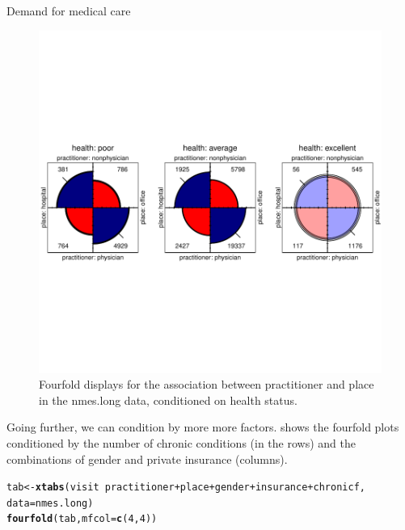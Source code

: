 \documentclass[11pt]{book}\usepackage[]{graphicx}\usepackage[]{color}
\makeatletter
\newcommand{\hlnum}[1]{\textcolor[rgb]{0.686,0.059,0.569}{#1}}%
\newcommand{\hlopt}[1]{\textcolor[rgb]{0,0,0}{#1}}%
\newcommand{\hlstd}[1]{\textcolor[rgb]{0.345,0.345,0.345}{#1}}%
\newcommand{\hlkwb}[1]{\textcolor[rgb]{0.69,0.353,0.396}{#1}}%
\newcommand{\hlkwc}[1]{\textcolor[rgb]{0.333,0.667,0.333}{#1}}%
\newcommand{\hlkwd}[1]{\textcolor[rgb]{0.737,0.353,0.396}{\textbf{#1}}}%
\newenvironment{kframe}{%
 \def\at@end@of@kframe{}%
 \ifinner\ifhmode%
  \def\at@end@of@kframe{\end{minipage}}%
  \begin{minipage}{\columnwidth}%
 \fi\fi%
 \def\FrameCommand##1{\hskip\@totalleftmargin \hskip-\fboxsep
 \colorbox{shadecolor}{##1}\hskip-\fboxsep
     \hskip-\linewidth \hskip-\@totalleftmargin \hskip\columnwidth}%
 \MakeFramed {\advance\hsize-\width
   \@totalleftmargin\z@ \linewidth\hsize
   \@setminipage}}%
 {\par\unskip\endMakeFramed%
 \at@end@of@kframe}
\newenvironment{knitrout}{}{} %
\renewenvironment{knitrout}{\small\renewcommand{\baselinestretch}{.85}}{} %
\makeatother
\begin{document}
\begin{Example}[nmes4]{Demand for medical care}
\begin{knitrout}
\begin{figure}[!htbp]
\centerline{\includegraphics[width=\textwidth,trim=0 130 0 130,clip]{ch09/fig/nmes4-fourfold1} }

\caption[Fourfold displays for the association between practitioner and place in the nmes]{Fourfold displays for the association between practitioner and place in the nmes.long data, conditioned on health status.\label{fig:nmes4-fourfold1}}
\end{figure}


\end{knitrout}

Going further, we can condition by  more more factors.   shows the fourfold plots conditioned by
the number of chronic conditions (in the rows) and the combinations of
gender and  private insurance (columns). 

\begin{knitrout}
\color{fgcolor}\begin{kframe}
\begin{alltt}
\hlstd{tab} \hlkwb{<-} \hlkwd{xtabs}\hlstd{(visit} \hlopt{~} \hlstd{practitioner} \hlopt{+} \hlstd{place} \hlopt{+} \hlstd{gender} \hlopt{+} \hlstd{insurance} \hlopt{+} \hlstd{chronicf,}
             \hlkwc{data}\hlstd{=nmes.long)}
\hlkwd{fourfold}\hlstd{(tab,} \hlkwc{mfcol}\hlstd{=}\hlkwd{c}\hlstd{(}\hlnum{4}\hlstd{,}\hlnum{4}\hlstd{))}
\end{alltt}
\end{kframe}\begin{figure}[!htbp]



\end{figure}
\end{knitrout}
\end{Example}
\end{document}
